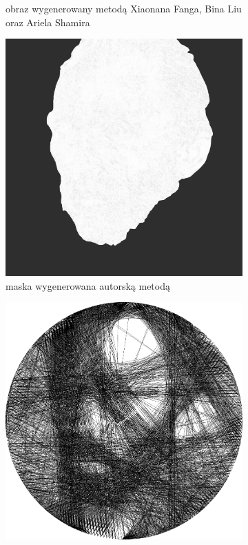 \documentclass[a4paper, 12pt, polish, twoside]{extreport}
\begin{document}
\begin{figure}[H]
\begin{subfigure}{0.24\textwidth}
        \caption{obraz wygenerowany metodą Xiaonana Fanga, Bina Liu oraz Ariela Shamira}
        \label{comp-comp-dufu-gogh-f}
    \end{subfigure}
    \begin{subfigure}{0.24\textwidth}
        \centering
        \includegraphics[width = \textwidth]{img/6-comp/gogh_mask_c20_inv0_bg10_obj1_ed1.png}
        \caption{maska wygenerowana autorską metodą}
        \label{comp-comp-dufu-gogh-g}
    \end{subfigure}
    \begin{subfigure}{0.24\textwidth}
        \centering
        \includegraphics[width = \textwidth]{img/6-comp/gogh_e_i2000_c20_inv0_bg10_obj1_ed1.png}

\end{subfigure}
\end{figure}
\end{document}

